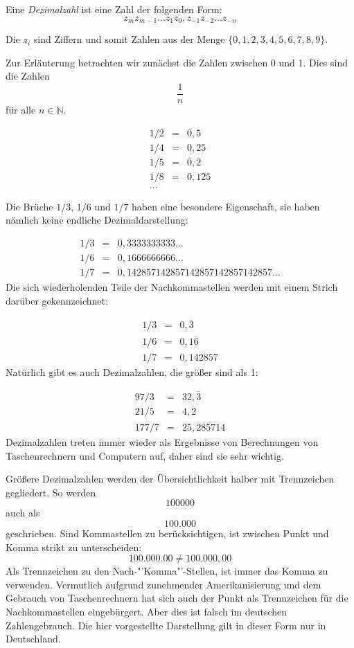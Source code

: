 \begin{definition}
Eine \textsl{Dezimalzahl} ist eine Zahl der folgenden Form:
\[ z_m z_{m-1} \dots z_1 z_0, z_{-1} z_{-2} \dots z_{-n} \]
\end{definition}
Die $z_i$ sind Ziffern und somit Zahlen aus der Menge $\{0,1,2,3,4,5,6,7,8,9\}$.

Zur Erläuterung betrachten wir zunächst die Zahlen zwischen 0 und 1. Dies sind die Zahlen 
\[ \frac{1}{n}\] für alle $n\in \mathbb{N}$. 

\begin{eqnarray*}
1/2 &=& 0,5 \\
1/4 &=& 0,25 \\
1/5 &=& 0,2 \\
1/8 &=& 0,125 \\
\dots
\end{eqnarray*}

Die Brüche $1/3$, $1/6$ und $1/7$ haben eine besondere Eigenschaft, sie haben nämlich keine endliche Dezimaldarstellung:

\begin{eqnarray*}
1/3 &=& 0,3333333333\dots \\
1/6 &=& 0,1666666666\dots \\
1/7 &=& 0,142857142857142857142857142857\dots
\end{eqnarray*}
Die sich wiederholenden Teile der Nachkommastellen werden mit einem Strich darüber gekennzeichnet:

\begin{eqnarray*}
1/3 &=& 0,\overline{3} \\
1/6 &=& 0,1\overline{6} \\
1/7 &=& 0,\overline{142857}
\end{eqnarray*}
Natürlich gibt es auch Dezimalzahlen, die größer sind als 1:

\begin{eqnarray*}
97/3 &=& 32,\overline{3} \\
21/5 &=& 4,2 \\
177/7 &=& 25,\overline{285714}
\end{eqnarray*}
Dezimalzahlen treten immer wieder als Ergebnisse von Berechnungen von Taschenrechnern und Computern auf, daher sind sie sehr wichtig. 

Größere Dezimalzahlen werden der Übersichtlichkeit halber mit Trennzeichen gegliedert. So werden 
\[100000\]
auch als
\[100.000\]
geschrieben. Sind Kommastellen zu berücksichtigen, ist zwischen Punkt und Komma strikt zu unterscheiden:
\[100.000.00 \ne 100.000,00\]
Als Trennzeichen zu den Nach-"'Komma"'-Stellen, ist immer das Komma zu verwenden. Vermutlich aufgrund zunehmender Amerikanisierung und dem Gebrauch von Taschenrechnern hat sich auch der Punkt als Trennzeichen für die Nachkommastellen eingebürgert. Aber dies ist falsch im deutschen Zahlengebrauch. Die hier vorgestellte Darstellung gilt in dieser Form nur in Deutschland. 

